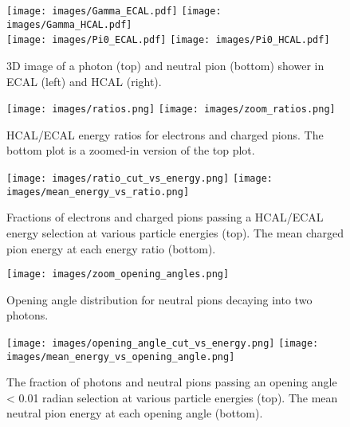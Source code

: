 \begin{figure*}[htbp]
\centering
\texttt{[image: images/Gamma\_ECAL.pdf]}
\texttt{[image: images/Gamma\_HCAL.pdf]} \\
\texttt{[image: images/Pi0\_ECAL.pdf]}
\texttt{[image: images/Pi0\_HCAL.pdf]}
\caption{3D image of a photon (top) and neutral pion (bottom) shower in ECAL (left) and HCAL (right).}
\label{fig:sample}
\end{figure*}


\begin{figure}[htbp]
\centering
\texttt{[image: images/ratios.png]}
\texttt{[image: images/zoom\_ratios.png]}
\caption{HCAL/ECAL energy ratios for electrons and charged pions. The bottom plot is a zoomed-in version of the top plot.}
\label{fig:HE_ratio}
\end{figure}

\begin{figure}[htbp]
\centering
\texttt{[image: images/ratio\_cut\_vs\_energy.png]}
\texttt{[image: images/mean\_energy\_vs\_ratio.png]}
\caption{Fractions of electrons and charged pions passing a HCAL/ECAL energy selection at various particle energies (top). The mean charged pion energy at each energy ratio (bottom).}
\label{fig:HE_ratio_energy}
\end{figure}

\begin{figure}[htbp]
\centering
\texttt{[image: images/zoom\_opening\_angles.png]}
\caption{Opening angle distribution for neutral pions decaying into two photons.}
\label{fig:opening_angle}
\end{figure}

\begin{figure}[htbp]
\centering
\texttt{[image: images/opening\_angle\_cut\_vs\_energy.png]}
\texttt{[image: images/mean\_energy\_vs\_opening\_angle.png]}
\caption{The fraction of photons and neutral pions passing an opening angle < 0.01 radian selection at various particle energies (top). The mean neutral pion energy at each opening angle (bottom).}
\label{fig:opening_angle_energy}
\end{figure}

